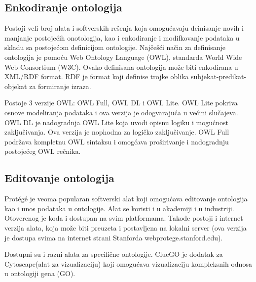 \documentclass[a4paper]{article}
\begin{document}
\subsection{Enkodiranje ontologija}

Postoji veli broj alata i softverskih rešenja koja omogućavaju deinisanje novih i manjanje postojećih onotologija, kao i 
enkodiranje i modifkovanje podataka u skladu sa postojećom definicijom ontologije.
Najčešći način za definisanje ontologija je pomoću Web Ontology Language (OWL), standarda World Wide Web Consortium (W3C).
Ovako definisana ontologija može biti enkodirana u XML/RDF format. RDF je format koji definise trojke oblika subjekat-predikat-objekat
za formiranje izraza. \par
Postoje 3 verzije OWL: OWL Full, OWL DL i OWL Lite.
OWL Lite pokriva osnove modeliranja podataka i ova verzija je odogvarajuća u većini slučajeva.
OWL DL je nadogradnja OWL Lite koja uvodi opisnu logiku i mogućnost zaključivanja. Ova verzija je nophodna za logičko zaključivanje.
OWL Full podržava kompletnu OWL sintaksu i omogćava proširivanje i nadogradnju postojećeg OWL rečnika.

\subsection{Editovanje ontologija}

Prot\'eg\'e je veoma popularan softverski alat koji omogućava editovanje ontologija kao i unos podataka u ontologije.
Alat se koristi i u akademiji i u industriji.
Otoverenog je koda i dostupan na svim platformama.
Takođe postoji i internet verzija alata, koja može biti preuzeta i postavljena na lokalni server 
(ova verzija je dostupa svima na internet strani Stanforda webprotege.stanford.edu). \par
Dostupni su i razni alata za specifične ontologije. ClueGO je dodatak za Cytoscape(alat za vizualizaciju)
 koji omogućava vizualizaciju kompleksnih odnosa u ontologiji gena (GO).
\end{document}
